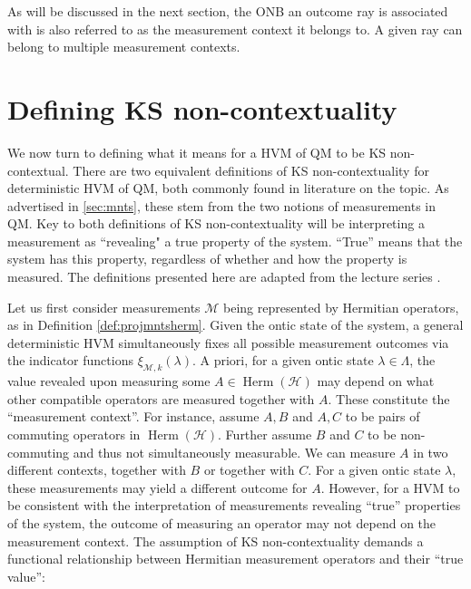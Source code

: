 As will be discussed in the next section, the ONB an outcome ray is associated with is also referred to as the measurement context it belongs to. A given ray can belong to multiple measurement contexts.

\section{Defining KS non-contextuality}
\label{sec:kscont}
We now turn to defining what it means for a HVM of QM to be KS non-contextual. There are two equivalent definitions of KS non-contextuality for deterministic HVM of QM, both commonly found in literature on the topic. As advertised in \ref{sec:mnts}, these stem from the two notions of measurements in QM. Key to both definitions of KS non-contextuality will be interpreting a measurement as ``revealing" a true property of the system. ``True” means that the system has this property, regardless of whether and how the property is measured. The definitions presented here are adapted from the lecture series \cite{Spekkens2012}.

Let us first consider measurements $\mathcal{M}$ being represented by Hermitian operators, as in Definition \ref{def:projmntsherm}. Given the ontic state of the system, a general deterministic HVM simultaneously fixes all possible measurement outcomes via the indicator functions $\xi_{\mathcal{M},k}(\lambda)$. A priori, for a given ontic state $\lambda\in\Lambda$, the value revealed upon measuring some $A\in\operatorname{Herm}(\mathcal{H})$ may depend on what other compatible operators are measured together with $A$. These constitute the ``measurement context”. For instance, assume $A,B$ and $A,C$ to be pairs of commuting operators in $\operatorname{Herm}(\mathcal{H})$. Further assume $B$ and $C$ to be non-commuting and thus not simultaneously measurable. We can measure $A$ in two different contexts, together with $B$ or together with $C$. For a given ontic state $\lambda$, these measurements may yield a different outcome for $A$. However, for a HVM to be consistent with the interpretation of measurements revealing ``true” properties of the system, the outcome of measuring an operator may not depend on the measurement context. The assumption of KS non-contextuality demands a functional relationship between Hermitian measurement operators and their ``true value”:

